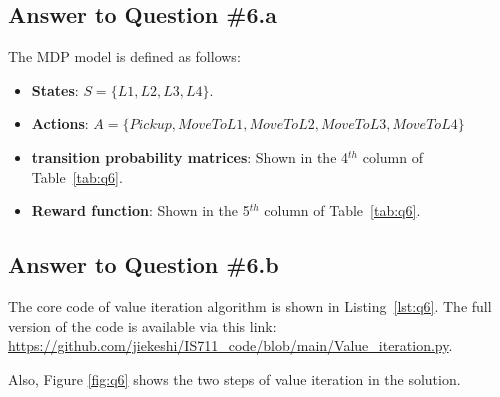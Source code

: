 \documentclass[conference]{styles/acmsiggraph}
\begin{document}
\subsection{Answer to Question \#6.a}
The MDP model is defined as follows:
\begin{itemize}[leftmargin=*]
	\setlength{\itemsep}{0pt}
	\setlength{\parsep}{0pt}
	\setlength{\parskip}{0pt}
	\item \textbf{States}: $S = \{L1, L2, L3, L4\}$.
	\item \textbf{Actions}: $A = \{Pickup, MoveToL1, MoveToL2, MoveToL3, MoveToL4\}$
	\item \textbf{transition probability matrices}: Shown in the 4$^{th}$ column of Table~\ref{tab:q6}.
	\item \textbf{Reward function}: Shown in the 5$^{th}$ column of Table~\ref{tab:q6}.
\end{itemize}


\subsection{Answer to Question \#6.b}
The core code of value iteration algorithm is shown in Listing~\ref{lst:q6}. The full version of the code is available via this link: \url{https://github.com/jiekeshi/IS711_code/blob/main/Value_iteration.py}.

Also, Figure \ref{fig:q6} shows the two steps of value iteration in the solution.
\end{document}
